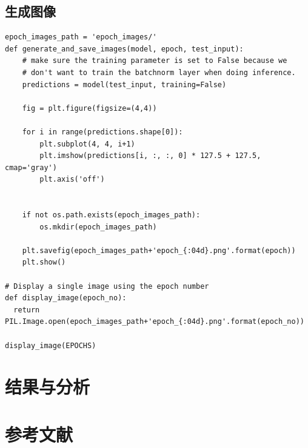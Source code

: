 \documentclass[a4paper, 12pt]{article}
\begin{document}
\subsection{生成图像}
\begin{lstlisting}[style=myPython,caption={生成图像}]
epoch_images_path = 'epoch_images/'
def generate_and_save_images(model, epoch, test_input):
    # make sure the training parameter is set to False because we
    # don't want to train the batchnorm layer when doing inference.
    predictions = model(test_input, training=False)

    fig = plt.figure(figsize=(4,4))
  
    for i in range(predictions.shape[0]):
        plt.subplot(4, 4, i+1)
        plt.imshow(predictions[i, :, :, 0] * 127.5 + 127.5, cmap='gray')
        plt.axis('off')


    if not os.path.exists(epoch_images_path):
        os.mkdir(epoch_images_path)
    
    plt.savefig(epoch_images_path+'epoch_{:04d}.png'.format(epoch))
    plt.show()

# Display a single image using the epoch number
def display_image(epoch_no):
  return PIL.Image.open(epoch_images_path+'epoch_{:04d}.png'.format(epoch_no))

display_image(EPOCHS)
\end{lstlisting}


\section{结果与分析}
\section{参考文献}
\end{document}
